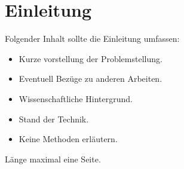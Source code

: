 \chapter{Einleitung}
\label{cha:Einleitung}

Folgender Inhalt sollte die Einleitung umfassen:

\begin{itemize}
    \item Kurze vorstellung der Problemstellung.
    \item Eventuell Bez\"uge zu anderen Arbeiten.
    \item Wissenschaftliche Hintergrund.
    \item Stand der Technik.
    \item Keine Methoden erl\"autern.
\end{itemize}

L\"ange maximal eine Seite.

